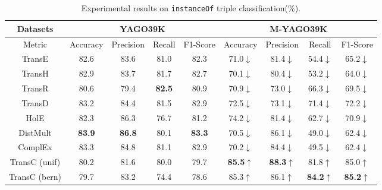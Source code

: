 \documentclass[11pt,a4paper]{article}
\begin{document}
  \begin{table*}[!htb]
    \centering
    \setlength{\belowcaptionskip}{-1pt}
    \small
        \begin{tabular}{c|cccc|cccc}
        \hline
        Datasets & \multicolumn{4}{c|}{YAGO39K} & \multicolumn{4}{c}{M-YAGO39K}\\
        \hline
        \multirow{1}{*}{Metric} & Accuracy & Precision & Recall & F1-Score & Accuracy & Precision & Recall & F1-Score \\
        \hline
        TransE  & 82.6  & 83.6  & 81.0   & 82.3 & 71.0$\downarrow$   & 81.4$\downarrow$  & 54.4$\downarrow$   & 65.2$\downarrow$   \\
        TransH  & 82.9  & 83.7   & 81.7   & 82.7 & 70.1$\downarrow$  & 80.4$\downarrow$   & 53.2$\downarrow$   & 64.0$\downarrow$  \\
        TransR  & 80.6  & 79.4   & \textbf{82.5}   & 80.9  & 70.9$\downarrow$  & 73.0$\downarrow$   & 66.3$\downarrow$   & 69.5$\downarrow$ \\
        TransD  & 83.2  & 84.4   & 81.5   & 82.9   & 72.5$\downarrow$  & 73.1$\downarrow$   & 71.4$\downarrow$   & 72.2$\downarrow$\\
        HolE    & 82.3  & 86.3   & 76.7   & 81.2 & 74.2$\downarrow$  & 81.4$\downarrow$   & 62.7$\downarrow$   & 70.9$\downarrow$  \\
        DistMult & \textbf{83.9}  & \textbf{86.8}   & 80.1   & \textbf{83.3} & 70.5$\downarrow$  & 86.1$\downarrow$   & 49.0$\downarrow$   & 62.4$\downarrow$  \\
        ComplEx & 83.3  & 84.8   & 81.1   & 82.9 & 70.2$\downarrow$  & 84.4$\downarrow$   & 49.5$\downarrow$   & 62.4$\downarrow$  \\
        \hline
        TransC (unif)  & 80.2  & 81.6   & 80.0   & 79.7  & \textbf{85.5}$\uparrow$  & \textbf{88.3}$\uparrow$   & 81.8$\uparrow$   & 85.0$\uparrow$ \\
        TransC (bern)  & 79.7  & 83.2   & 74.4   & 78.6 & 85.3$\uparrow$  & 86.1$\uparrow$   & \textbf{84.2}$\uparrow$   & \textbf{85.2}$\uparrow$ \\
        \hline
        \end{tabular}
        \caption{\label{table3}Experimental results on \texttt{instanceOf} triple classification(\%).}
    \end{table*}
  
\end{document}
